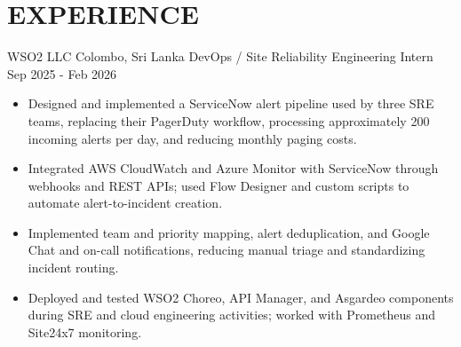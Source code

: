 \section{EXPERIENCE}

\resumeentry
  {WSO2 LLC}
  {Colombo, Sri Lanka}
  {DevOps / Site Reliability Engineering Intern}
  {Sep 2025 - Feb 2026}

\begin{itemize}
  \item Designed and implemented a ServiceNow alert pipeline used by three SRE teams, replacing their PagerDuty workflow, processing approximately 200 incoming alerts per day, and reducing monthly paging costs.
  \item Integrated AWS CloudWatch and Azure Monitor with ServiceNow through webhooks and REST APIs; used Flow Designer and custom scripts to automate alert-to-incident creation.
  \item Implemented team and priority mapping, alert deduplication, and Google Chat and on-call notifications, reducing manual triage and standardizing incident routing.
  \item Deployed and tested WSO2 Choreo, API Manager, and Asgardeo components during SRE and cloud engineering activities; worked with Prometheus and Site24x7 monitoring.
\end{itemize}
